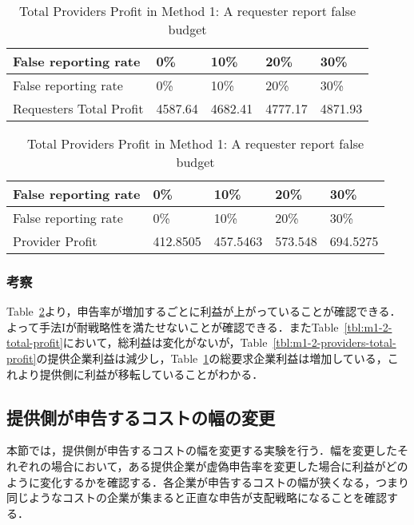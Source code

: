 \hypertarget{tbl:m1-2-requesters-total-profit}{}
\begin{longtable}[H]{@{}lllll@{}}
\caption{\label{tbl:m1-2-requesters-total-profit}Total Providers Profit
in Method 1: A requester report false budget}\tabularnewline
\toprule
False reporting rate & 0\% & 10\% & 20\% & 30\%\tabularnewline
\midrule
\endfirsthead
\toprule
False reporting rate & 0\% & 10\% & 20\% & 30\%\tabularnewline
\midrule
\endhead
Requesters Total Profit & 4587.64 & 4682.41 & 4777.17 &
4871.93\tabularnewline
\bottomrule
\end{longtable}

\hypertarget{tbl:m1-2-false-requester-profit}{}
\begin{longtable}[H]{@{}lllll@{}}
\caption{\label{tbl:m1-2-false-requester-profit}Total Providers Profit
in Method 1: A requester report false budget}\tabularnewline
\toprule
False reporting rate & 0\% & 10\% & 20\% & 30\%\tabularnewline
\midrule
\endfirsthead
\toprule
False reporting rate & 0\% & 10\% & 20\% & 30\%\tabularnewline
\midrule
\endhead
Provider Profit & 412.8505 & 457.5463 & 573.548 &
694.5275\tabularnewline
\bottomrule
\end{longtable}

\hypertarget{ux8003ux5bdf-1}{%
\subsubsection{考察}\label{ux8003ux5bdf-1}}

Table~\ref{tbl:m1-2-false-requester-profit}より，申告率が増加するごとに利益が上がっていることが確認できる．よって手法Iが耐戦略性を満たせないことが確認できる．またTable~\ref{tbl:m1-2-total-profit}において，総利益は変化がないが，Table~\ref{tbl:m1-2-providers-total-profit}の提供企業利益は減少し，Table~\ref{tbl:m1-2-requesters-total-profit}の総要求企業利益は増加している，これより提供側に利益が移転していることがわかる．

\hypertarget{ux63d0ux4f9bux5074ux304cux7533ux544aux3059ux308bux30b3ux30b9ux30c8ux306eux5e45ux306eux5909ux66f4}{%
\subsection{提供側が申告するコストの幅の変更}\label{ux63d0ux4f9bux5074ux304cux7533ux544aux3059ux308bux30b3ux30b9ux30c8ux306eux5e45ux306eux5909ux66f4}}

本節では，提供側が申告するコストの幅を変更する実験を行う．幅を変更したそれぞれの場合において，ある提供企業が虚偽申告率を変更した場合に利益がどのように変化するかを確認する．各企業が申告するコストの幅が狭くなる，つまり同じようなコストの企業が集まると正直な申告が支配戦略になることを確認する．

